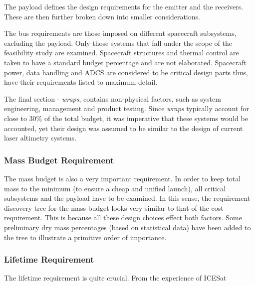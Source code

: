 The payload defines the design requirements for the emitter and the receivers. These are then further broken down into smaller considerations.

The bus requirements are those imposed on different spacecraft subsystems, excluding the payload. Only those systems that fall under the scope of the feasibility study are examined. Spacecraft structures and thermal control are taken to have a standard budget percentage and are not elaborated. Spacecraft power, data handling and \ac{ADCS} are considered to be critical design parts thus, have their requirements listed to maximum detail.

The final section - \emph{wraps}, contains non-physical factors, such as system engineering, management and product testing. Since \emph{wraps} typically account for close to 30\% of the total budget\cite{larson}, it was imperative that these systems would be accounted, yet their design was assumed to be similar to the design of current laser altimetry systems.

\subsubsection{Mass Budget Requirement}
\label{blMBR} 
The mass budget is also a very important requirement. In order to keep total mass to the minimum (to ensure a cheap and unified launch), all critical subsystems and the payload have to be examined. In this sense, the requirement discovery tree for the mass budget looks very similar to that of the cost requirement. This is because all these design choices effect both factors. Some preliminary dry mass percentages (based on statistical data\cite{larson}) have been added to the tree to illustrate a primitive order of importance.

\subsubsection{Lifetime Requirement}
\label{blLBR}
The lifetime requirement is quite crucial. From the experience of ICESat